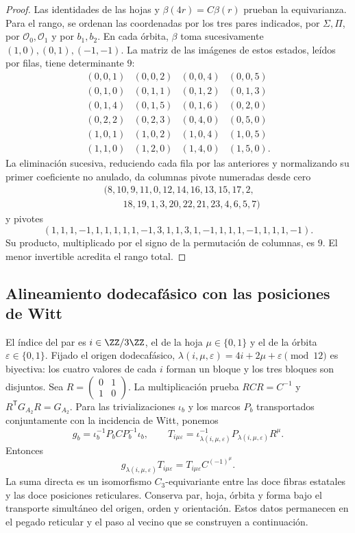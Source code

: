 \begin{proof}
Las identidades de las hojas y \(\beta(4r)=C\beta(r)\) prueban la
equivarianza. Para el rango, se ordenan las coordenadas por los tres
pares indicados, por \(\Sigma,\Pi\), por \(\mathcal O_0,\mathcal O_1\)
y por \(b_1,b_2\). En cada órbita, \(\beta\) toma sucesivamente
\((1,0),(0,1),(-1,-1)\). La matriz de las imágenes de estos estados,
leídos por filas, tiene determinante \(9\):
\[
\begin{array}{rrrr}
(0,0,1)&(0,0,2)&(0,0,4)&(0,0,5)\\
(0,1,0)&(0,1,1)&(0,1,2)&(0,1,3)\\
(0,1,4)&(0,1,5)&(0,1,6)&(0,2,0)\\
(0,2,2)&(0,2,3)&(0,4,0)&(0,5,0)\\
(1,0,1)&(1,0,2)&(1,0,4)&(1,0,5)\\
(1,1,0)&(1,2,0)&(1,4,0)&(1,5,0).
\end{array}
\]
La eliminación sucesiva, reduciendo cada fila por las anteriores y
normalizando su primer coeficiente no anulado, da columnas pivote
numeradas desde cero
\[
\begin{split}
&(8,10,9,11,0,12,14,16,13,15,17,2,\\
&\hspace{2em}18,19,1,3,20,22,21,23,4,6,5,7)
\end{split}
\]
y pivotes
\[
(1,1,1,-1,1,1,1,1,1,-1,3,1,1,3,1,-1,1,1,1,-1,1,1,1,-1).
\]
Su producto, multiplicado por el signo de la permutación de columnas,
es \(9\). El menor invertible acredita el rango total.
\end{proof}

\subsection{Alineamiento dodecafásico con las posiciones de Witt}
\label{x_reciprocidad:nuclear:alineamiento-witt}
El índice del par es \(i\in\ZZ/3\ZZ\), el de la hoja
\(\mu\in\{0,1\}\) y el de la órbita \(\varepsilon\in\{0,1\}\).
Fijado el origen dodecafásico, \(\lambda(i,\mu,\varepsilon)
=4i+2\mu+\varepsilon\pmod{12}\) es biyectiva: los cuatro valores
de cada \(i\) forman un bloque y los tres bloques son disjuntos.
Sea \(R=\left(\begin{smallmatrix}0&1\\1&0\end{smallmatrix}\right)\).
La multiplicación prueba \(RCR=C^{-1}\) y
\(R^{\mathsf T}G_{A_2}R=G_{A_2}\). Para las trivializaciones
\(\iota_b\) y los marcos \(P_b\) transportados conjuntamente con
la incidencia de Witt, ponemos
\[
g_b=\iota_b^{-1}P_bCP_b^{-1}\iota_b,\qquad
T_{i\mu\varepsilon}=\iota_{\lambda(i,\mu,\varepsilon)}^{-1}
P_{\lambda(i,\mu,\varepsilon)}R^\mu.
\]
Entonces
\[
g_{\lambda(i,\mu,\varepsilon)}T_{i\mu\varepsilon}
=T_{i\mu\varepsilon}C^{(-1)^\mu}.
\]
La suma directa es un isomorfismo \(C_3\)-equivariante entre las doce
fibras estatales y las doce posiciones reticulares. Conserva par,
hoja, órbita y forma bajo el transporte simultáneo del origen,
orden y orientación. Estos datos permanecen en el pegado reticular
y el paso al vecino que se construyen a continuación.

